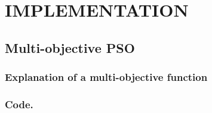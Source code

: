 \chapter{IMPLEMENTATION}
\section{Multi-objective PSO}
\subsection{Explanation of a multi-objective function }
\subsection{Code.}
